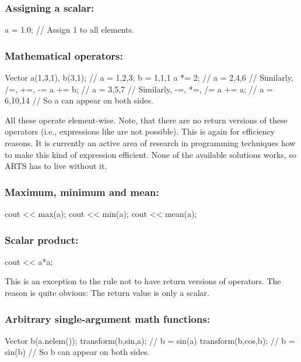 \subsubsection{Assigning a scalar:}
\begin{code}
a = 1.0;                        // Assign 1 to all elements.
\end{code}

\subsubsection{Mathematical operators:}
\begin{code}
Vector a(1,3,1), b(3,1); // a = 1,2,3; b = 1,1,1
a *= 2;                  // a = 2,4,6
                         // Similarly, /=, +=, -=
a += b;                  // a = 3,5,7
                         // Similarly, -=, *=, /=
a += a;                  // a = 6,10,14
                         // So a can appear on both sides.
\end{code}

All these operate element-wise.  Note, that there are no return
versions of these operators (i.e., expressions like  are
not possible). This is again for efficiency reasons. It is currently
an active area of research in programming techniques how to make this
kind of expression efficient. None of the available solutions works,
so ARTS has to live without it.

\subsubsection{Maximum, minimum and mean:}
\begin{code}
cout << max(a);
cout << min(a);
cout << mean(a);
\end{code}

\subsubsection{Scalar product:}
\begin{code}
cout << a*a;
\end{code}

This is an exception to the rule not to have return versions of
operators. The reason is quite obvious: The return value is only a
scalar. 

\subsubsection{Arbitrary single-argument math functions:}
\begin{code}
Vector b(a.nelem());
transform(b,sin,a);  // b = sin(a)
transform(b,cos,b);  // b = sin(b)
                     // So b can appear on both sides.
\end{code}

